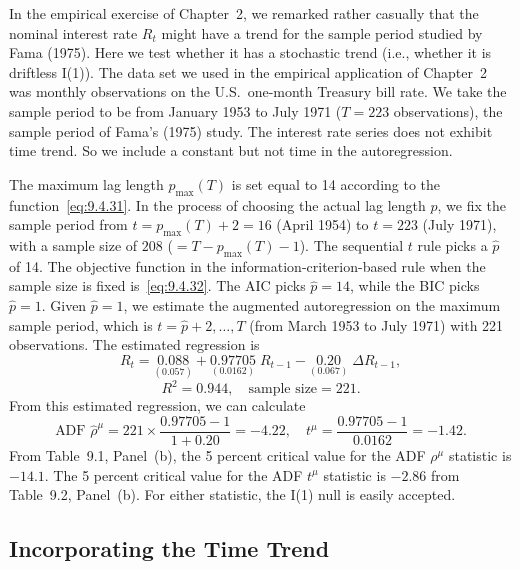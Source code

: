 \begin{example}
\label{ex:9.2}
In the empirical exercise of Chapter~2, we remarked rather casually that the nominal interest rate $R_t$ might have
a trend for the sample period studied by Fama (1975). Here we test whether
it has a stochastic trend (i.e., whether it is driftless I(1)). The data set we
used in the empirical application of Chapter~2 was monthly observations on
the U.S.\ one-month Treasury bill rate. We take the sample period to be from
January 1953 to July 1971 ($T = 223$ observations), the sample period of
Fama's (1975) study. The interest rate series does not exhibit time trend. So
we include a constant but not time in the autoregression.

The maximum lag length $p_{\max}(T)$ is set equal to 14 according to the function~\eqref{eq:9.4.31}. In the process of choosing the actual lag length $\hat{p}$, we fix the
sample period from $t = p_{\max}(T) + 2 = 16$ (April 1954) to $t = 223$ (July
1971), with a sample size of $208$ ($= T - p_{\max}(T) - 1$). The sequential $t$ rule
picks a $\hat{p}$ of 14. The objective function in the information-criterion-based
rule when the sample size is fixed is~\eqref{eq:9.4.32}. The AIC picks $\hat{p} = 14$, while
the BIC picks $\hat{p} = 1$. Given $\hat{p} = 1$, we estimate the augmented autoregression on the maximum sample period, which is $t = \hat{p} + 2, \ldots, T$ (from March
1953 to July 1971) with 221 observations. The estimated regression is
\[
R_t = \underset{(0.057)}{0.088} + \underset{(0.0162)}{0.97705}\; R_{t-1}
- \underset{(0.067)}{0.20}\;\Delta R_{t-1},
\]
\[
R^2 = 0.944, \quad \text{sample size} = 221.
\]
From this estimated regression, we can calculate
\[
\text{ADF } \hat{\rho}^\mu = 221 \times \frac{0.97705 - 1}{1 + 0.20} = -4.22,
\quad t^\mu = \frac{0.97705 - 1}{0.0162} = -1.42.
\]
From Table~9.1, Panel~(b), the 5 percent critical value for the ADF $\rho^\mu$ statistic
is $-14.1$. The 5 percent critical value for the ADF $t^\mu$ statistic is $-2.86$ from
Table~9.2, Panel~(b). For either statistic, the I(1) null is easily accepted.
\end{example}

\subsection*{Incorporating the Time Trend}

